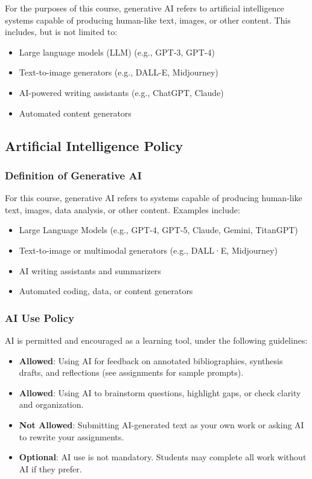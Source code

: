\documentclass[12pt, letterpaper]{article}
\begin{document}
\noindent For the purposes of this course, generative AI refers to artificial intelligence systems capable of producing human-like text, images, or other content. This includes, but is not limited to:

\begin{itemize}
    \item Large language models (LLM) (e.g., GPT-3, GPT-4)
    \item Text-to-image generators (e.g., DALL-E, Midjourney)
    \item AI-powered writing assistants (e.g., ChatGPT, Claude)
    \item Automated content generators
\end{itemize}

\subsection*{Artificial Intelligence Policy}

\subsubsection*{Definition of Generative AI}

\noindent For this course, generative AI refers to systems capable of producing human-like text, images, data analysis, or other content. Examples include:

\begin{itemize}
    \item Large Language Models (e.g., GPT-4, GPT-5, Claude, Gemini, TitanGPT)
    \item Text-to-image or multimodal generators (e.g., DALL·E, Midjourney)
    \item AI writing assistants and summarizers
    \item Automated coding, data, or content generators
\end{itemize}

\subsubsection*{AI Use Policy}

AI is permitted and encouraged as a learning tool, under the following guidelines:

\begin{itemize}
    \item \textbf{Allowed}: Using AI for feedback on annotated bibliographies, synthesis drafts, and reflections (see assignments for sample prompts).
    \item \textbf{Allowed}: Using AI to brainstorm questions, highlight gaps, or check clarity and organization.
    \item \textbf{Not Allowed}: Submitting AI-generated text as your own work or asking AI to rewrite your assignments.
    \item \textbf{Optional}: AI use is not mandatory. Students may complete all work without AI if they prefer.
\end{itemize}
\end{document}
